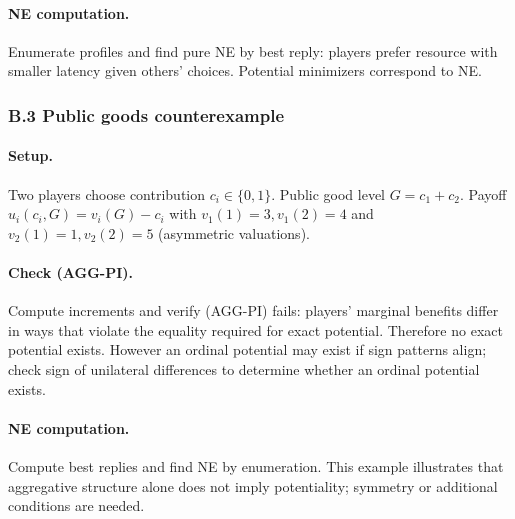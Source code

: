 \documentclass[11pt]{article}
\begin{document}
\paragraph{NE computation.} Enumerate profiles and find pure NE by best
reply: players prefer resource with smaller latency given others' choices.
Potential minimizers correspond to NE.

\subsubsection{B.3 Public goods counterexample}

\paragraph{Setup.} Two players choose contribution \(c_i\in\{0,1\}\). Public
good level \(G=c_1+c_2\). Payoff \(u_i(c_i,G)=v_i(G)-c_i\) with
\(v_1(1)=3,v_1(2)=4\) and \(v_2(1)=1,v_2(2)=5\) (asymmetric valuations).

\paragraph{Check (AGG-PI).} Compute increments and verify (AGG-PI) fails:
players' marginal benefits differ in ways that violate the equality required
for exact potential. Therefore no exact potential exists. However an ordinal
potential may exist if sign patterns align; check sign of unilateral
differences to determine whether an ordinal potential exists.

\paragraph{NE computation.} Compute best replies and find NE by enumeration.
This example illustrates that aggregative structure alone does not imply
potentiality; symmetry or additional conditions are needed.
\end{document}
